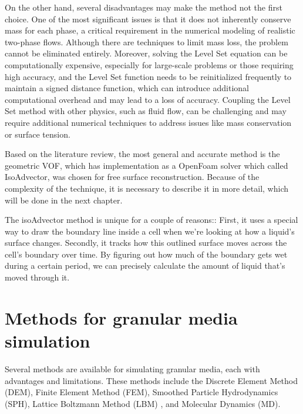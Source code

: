 On the other hand, several disadvantages may make the method not the first choice. One of the most significant issues is that it does not inherently conserve mass for each phase, a critical requirement in the numerical modeling of realistic two-phase flows. Although there are techniques to limit mass loss, the problem cannot be eliminated entirely. Moreover, solving the Level Set equation can be computationally expensive, especially for large-scale problems or those requiring high accuracy, and the Level Set function needs to be reinitialized frequently to maintain a signed distance function, which can introduce additional computational overhead and may lead to a loss of accuracy. Coupling the Level Set method with other physics, such as fluid flow, can be challenging and may require additional numerical techniques to address issues like mass conservation or surface tension.

Based on the literature review, the most general and accurate method is the geometric VOF, which has implementation as a OpenFoam solver \cite{roenby2019isoadvector} which called IsoAdvector, was chosen for free surface reconstruction. Because of the complexity of the technique, it is necessary to describe it in more detail, which will be done in the next chapter.

The isoAdvector method is unique for a couple of reasons:: First, it uses a special way to draw the boundary line inside a cell when we're looking at how a liquid's surface changes. Secondly, it tracks how this outlined surface moves across the cell's boundary over time. By figuring out how much of the boundary gets wet during a certain period, we can precisely calculate the amount of liquid that's moved through it.



\section{Methods for granular media simulation}

Several methods are available for simulating granular media, each with advantages and limitations. These methods include the Discrete Element Method (DEM)\cite{cundall1979discrete}, Finite Element Method (FEM), Smoothed Particle Hydrodynamics (SPH)\cite{monaghan1994SPH}, Lattice Boltzmann Method (LBM) \cite{chen1998lattice} \cite{begum2008lattice}, and Molecular Dynamics (MD).

